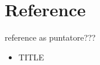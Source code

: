 \section{Reference}


\begin{osservazione}
reference as puntatore???
\end{osservazione}

\begin{osservazione}
\begin{itemize}
 \item TITLE
\end{itemize}
\end{osservazione}


